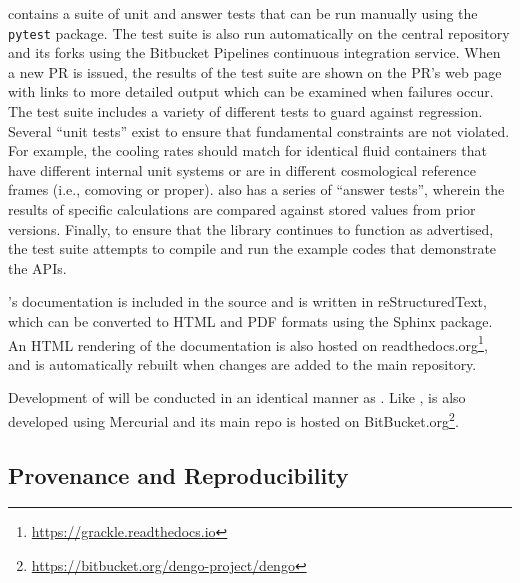 \grackle{} contains a suite of unit and answer
tests that can be run manually using the \texttt{pytest} package.  The
test suite is also run automatically on the central repository and its
forks using the Bitbucket Pipelines continuous integration service.
When a new PR is issued, the results of the test suite are
shown on the PR's web page with links to more detailed
output which can be examined when failures occur.  The test suite
includes a variety of different tests to guard against regression.
Several ``unit tests'' exist to ensure that fundamental
constraints are not violated.  For example, the cooling rates should
match for identical fluid containers that have different internal unit
systems or are in different cosmological reference frames (i.e.,
comoving or proper).  \grackle{} also has a series of ``answer
tests'', wherein the results of specific calculations are compared
against stored values from prior versions.  Finally, to ensure that
the library continues to function as advertised, the test suite
attempts to compile and run the example codes that demonstrate the
APIs.

\grackle{}'s documentation is included in the source and is written in
reStructuredText, which can be converted to HTML and PDF formats
using the Sphinx package.  An HTML rendering of the documentation is
also hosted on
readthedocs.org\footnote{\url{https://grackle.readthedocs.io}},
and is automatically rebuilt when changes are added to the main
repository.

Development of \dengo{} will be conducted in an identical manner as
\grackle{}.  Like \grackle{}, \dengo{} is also developed using
Mercurial and its main repo is hosted on
BitBucket.org\footnote{\url{https://bitbucket.org/dengo-project/dengo}}.

\subsection{Provenance and Reproducibility}


